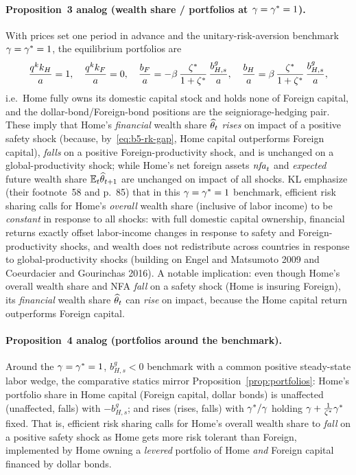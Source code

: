 \paragraph{Proposition~3 analog (wealth share / portfolios at $\gamma=\gamma^{*}=1$).}
With prices set one period in advance and the unitary-risk-aversion benchmark
$\gamma=\gamma^{*}=1$, the equilibrium portfolios are
\begin{equation}
\frac{q^{k} k_H}{a}=1,\quad \frac{q^{k} k_F}{a}=0,\quad
\frac{b_F}{a}=-\beta\,\frac{\zeta^{*}}{1+\zeta^{*}}\,\frac{b^g_{H,s}}{a},\quad
\frac{b_H}{a}=\beta\,\frac{\zeta^{*}}{1+\zeta^{*}}\,\frac{b^g_{H,s}}{a}, \label{eq:b5-prop3-port}
\end{equation}
i.e.\ Home fully owns its domestic capital stock and holds none of Foreign capital,
and the dollar-bond/Foreign-bond positions are the seigniorage-hedging pair. These
imply that Home's \emph{financial} wealth share $\widehat{\theta}_t$ \emph{rises} on
impact of a positive safety shock (because, by~\eqref{eq:b5-rk-gap}, Home capital
outperforms Foreign capital), \emph{falls} on a positive Foreign-productivity
shock, and is unchanged on a global-productivity shock; while Home's net foreign
assets $\mathit{nfa}_t$ and \emph{expected} future wealth share $\mathbb{E}_t\widehat{\theta}_{t+1}$ are
unchanged on impact of all shocks. KL emphasize (their footnote~58 and p.~85) that
in this $\gamma=\gamma^{*}=1$ benchmark, efficient risk sharing calls for Home's
\emph{overall} wealth share (inclusive of labor income) to be \emph{constant} in
response to all shocks: with full domestic capital ownership, financial returns
exactly offset labor-income changes in response to safety and Foreign-productivity
shocks, and wealth does not redistribute across countries in response to
global-productivity shocks (building on Engel and Matsumoto 2009 and Coeurdacier
and Gourinchas 2016). A notable implication: even though Home's overall wealth
share and NFA \emph{fall} on a safety shock (Home is insuring Foreign), its
\emph{financial} wealth share $\widehat{\theta}_t$ can \emph{rise} on impact, because the
Home capital return outperforms Foreign capital.

\paragraph{Proposition~4 analog (portfolios around the benchmark).} Around the
$\gamma=\gamma^{*}=1$, $b^g_{H,s}<0$ benchmark with a common positive steady-state labor
wedge, the comparative statics mirror Proposition~\ref{prop:portfolios}: Home's
portfolio share in Home capital (Foreign capital, dollar bonds) is unaffected
(unaffected, falls) with $-b^g_{H,s}$; and rises (rises, falls) with $\gamma^{*}/\gamma$
holding $\gamma+\frac{1}{\zeta^{*}}\gamma^{*}$ fixed. That is, efficient risk sharing calls for
Home's overall wealth share to \emph{fall} on a positive safety shock as Home gets
more risk tolerant than Foreign, implemented by Home owning a \emph{levered}
portfolio of Home \emph{and} Foreign capital financed by dollar bonds.

